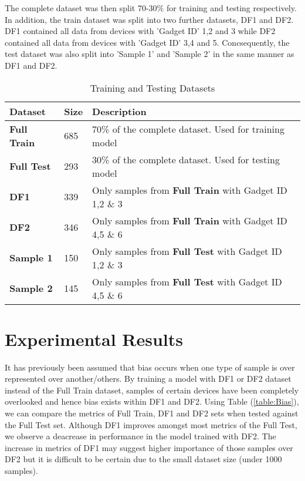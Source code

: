 The complete dataset was then split 70-30\% for training and testing respectively. 
In addition, the train dataset was split into two further datasets, DF1 and DF2. 
DF1 contained all data from devices with 'Gadget ID' 1,2 and 3 while DF2 contained all data from devices with 'Gadget ID' 3,4 and 5.
Concsequently, the test dataset was also split into 'Sample 1' and 'Sample 2' in the same manner as DF1 and DF2.

\begin{table}[H]
    \begin{center}
        \caption{Training and Testing Datasets}
        \label{table:datasets} 
        \begin{tabular}{lll}
            \toprule
            \textbf{Dataset} & \textbf{Size} &\textbf{Description} \\ [0.5ex]
            \midrule
            \textbf{Full Train} &685& 70\% of the complete dataset. Used for training model \\
            \textbf{Full Test}  &293& 30\% of the complete dataset. Used for testing model \\
            \textbf{DF1}        &339& Only samples from \textbf{Full Train} with Gadget ID 1,2 \& 3 \\
            \textbf{DF2}        &346& Only samples from \textbf{Full Train} with Gadget ID 4,5 \& 6 \\
            \textbf{Sample 1}   &150& Only samples from \textbf{Full Test} with Gadget ID 1,2 \& 3 \\
            \textbf{Sample 2}   &145& Only samples from \textbf{Full Test} with Gadget ID 4,5 \& 6 \\
            \bottomrule
        \end{tabular}
    \end{center}
\end{table}

\section{Experimental Results}
It has previously been assumed that bias occurs when one type of sample is over represented over another/others.
By training a model with DF1 or DF2 dataset instead of the Full Train dataset, samples of certain devices have been completely overlooked and hence bias exists within DF1 and DF2. 
Using Table (\ref{table:Bias}), we can compare the metrics of Full Train, DF1 and DF2 sets when tested against the Full Test set.
Although DF1 improves amongst most metrics of the Full Test, we observe a deacrease in performance in the model trained with DF2.
The increase in metrics of DF1 may suggest higher importance of those samples over DF2 but it is difficult to be certain due to the small dataset size (under 1000 samples).

